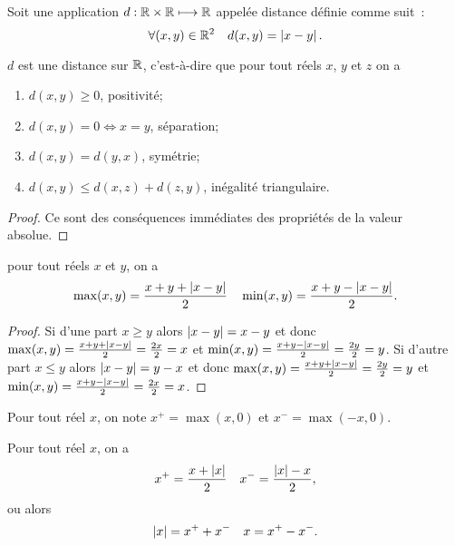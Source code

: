 \begin{defdef}
  Soit une application \(d:\mathbb{R}\times\mathbb{R}\longmapsto \mathbb{R}\) appelée distance définie comme suit~:
  \begin{equation}
    \forall (x,y) \in \mathbb{R}^2 \quad d(x,y)=\left\lvert x-y\right\rvert.
  \end{equation}
\end{defdef}
\begin{prop}
  \(d\) est une distance sur \(\mathbb{R}\), c'est-à-dire que pour tout réels \(x\), \(y\) et \(z\) on a
  \begin{enumerate}
  \item \(d(x,y)\geqslant 0\), positivité;
  \item \(d(x,y)=0 \iff x=y\), séparation;
  \item \(d(x,y)=d(y,x)\), symétrie;
  \item \(d(x,y)\leqslant d(x,z)+d(z,y)\), inégalité triangulaire.
  \end{enumerate}
\end{prop}
\begin{proof}
  Ce sont des conséquences immédiates des propriétés de la valeur absolue.
\end{proof}
\begin{prop}
  pour tout réels \(x\) et \(y\), on a
  \begin{equation}
    \max(x,y)=\frac{x+y+\left\lvert x-y\right\rvert}{2} \quad \min(x,y)=\frac{x+y-\left\lvert x-y\right\rvert}{2}.
  \end{equation}
\end{prop}
\begin{proof}
  Si d'une part \(x\geqslant y\) alors \(\left\lvert x-y\right\rvert=x-y\) et donc \(\max(x,y)=\frac{x+y+\left\lvert x-y\right\rvert}{2}=\frac{2x}{2}=x\) et \(\min(x,y)=\frac{x+y-\left\lvert x-y\right\rvert}{2}=\frac{2y}{2}=y\). Si d'autre part \(x\leqslant y\) alors \(\left\lvert x-y\right\rvert=y-x\) et donc \(\max(x,y)=\frac{x+y+\left\lvert x-y\right\rvert}{2}=\frac{2y}{2}=y\) et \(\min(x,y)=\frac{x+y-\left\lvert x-y\right\rvert}{2}=\frac{2x}{2}=x\).
\end{proof}
\begin{defdef}
  Pour tout réel \(x\), on note \(x^+=\max(x,0)\) et \(x^-=\max(-x,0)\).
\end{defdef}
\begin{prop}
  Pour tout réel \(x\), on a
  \begin{equation}
    x^+=\frac{x+\left\lvert x\right\rvert}{2} \quad x^-=\frac{\left\lvert x\right\rvert-x}{2},
  \end{equation}
  ou alors
  \begin{equation}
    \left\lvert x\right\rvert=x^++x^- \quad x=x^+-x^-.
  \end{equation}
\end{prop}
